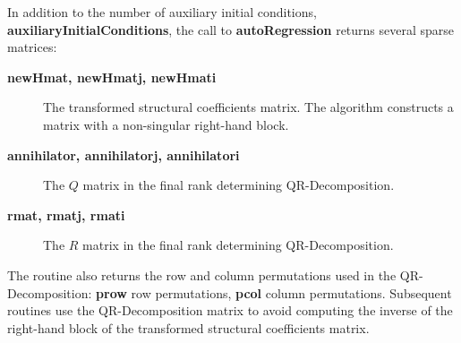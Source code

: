 \documentclass{article}
\begin{document}
In addition to the number of auxiliary initial conditions, 
{\bf auxiliaryInitialConditions}, the call to 
{\bf autoRegression} returns several sparse matrices:
\begin{description}
\item[{\bf newHmat, newHmatj, newHmati}] The transformed structural coefficients
matrix. The algorithm constructs a matrix with a non-singular right-hand block.
\item[{\bf annihilator, annihilatorj, annihilatori}] The $Q$ matrix in the
final rank determining QR-Decomposition.
\item[{\bf rmat, rmatj, rmati}] The $R$ matrix in the
final rank determining QR-Decomposition.
\end{description}
The routine also returns the row and column permutations used in the QR-Decomposition:
{\bf prow} row permutations,
{\bf pcol} column permutations.
Subsequent routines use the QR-Decomposition matrix to avoid
computing the inverse of the right-hand block of the transformed structural
coefficients matrix.
\end{document}
